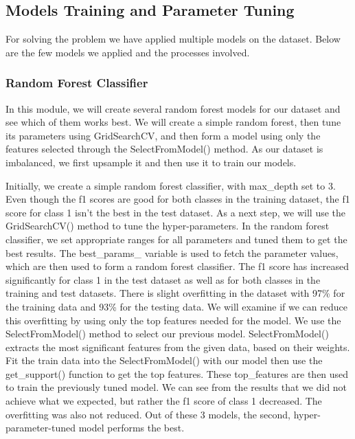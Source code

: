 \documentclass[12pt]{article}
\begin{document}
\subsection{Models Training and Parameter Tuning}

For solving the problem we have applied multiple models on the dataset.
Below are the few models we applied and the processes involved.
 
\subsubsection{Random Forest Classifier}

In this module, we will create several random forest models for our dataset and see which of them works best. We will create a simple random forest, then tune its parameters using GridSearchCV, and then form a model using only the features selected through the SelectFromModel() method. As our dataset is imbalanced, we first upsample it and then use it to train our models.

Initially, we create a simple random forest classifier, with max\_depth set to 3. Even though the f1 scores are good for both classes in the training dataset, the f1 score for class 1 isn't the best in the test dataset. As a next step, we will use the GridSearchCV() method to tune the hyper-parameters. In the random forest classifier, we set appropriate ranges for all parameters and tuned them to get the best results. The best\_params\_ variable is used to fetch the parameter values, which are then used to form a random forest classifier. The f1 score has increased significantly for class 1 in the test dataset as well as for both classes in the training and test datasets. There is slight overfitting in the dataset with 97\% for the training data and 93\% for the testing data. We will examine if we can reduce this overfitting by using only the top features needed for the model. We use the SelectFromModel() method to select our previous model. SelectFromModel() extracts the most significant features from the given data, based on their weights. Fit the train data into the SelectFromModel() with our model then use the get\_support() function to get the top features. These top\_features are then used to train the previously tuned model. We can see from the results that we did not achieve what we expected, but rather the f1 score of class 1 decreased. The overfitting was also not reduced. Out of these 3 models, the second, hyper-parameter-tuned model performs the best.
\end{document}
